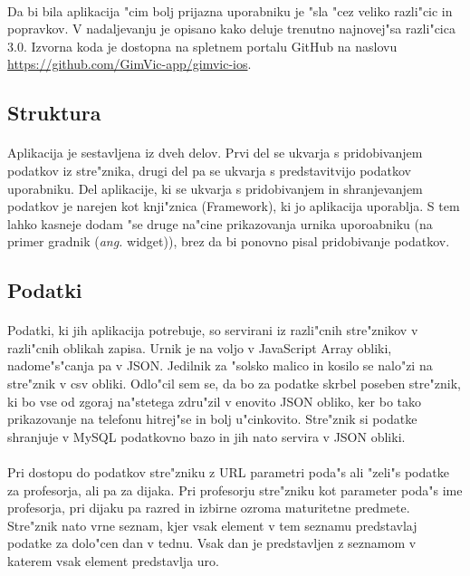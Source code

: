 \paragraph{}Da bi bila aplikacija "cim bolj prijazna uporabniku je "sla "cez veliko razli"cic in popravkov. V nadaljevanju je opisano kako deluje trenutno najnovej"sa razli"cica 3.0. Izvorna koda je dostopna na spletnem portalu GitHub na naslovu \url{https://github.com/GimVic-app/gimvic-ios}.

\subsection{Struktura}
\paragraph{}
Aplikacija je sestavljena iz dveh delov. Prvi del se ukvarja s pridobivanjem podatkov iz stre"znika, drugi del pa se ukvarja s predstavitvijo podatkov uporabniku. Del aplikacije, ki se ukvarja s pridobivanjem in shranjevanjem podatkov je narejen kot knji"znica (Framework), ki jo aplikacija uporablja. S tem lahko kasneje dodam "se druge na"cine prikazovanja urnika uporoabniku (na primer gradnik (\textit{ang.} widget)), brez da bi ponovno pisal pridobivanje podatkov.

\subsection{Podatki} 
\paragraph{}Podatki, ki jih aplikacija potrebuje, so servirani iz razli"cnih stre"znikov v razli"cnih oblikah zapisa. Urnik je na voljo v JavaScript Array\cite{js-array} obliki, nadome"s"canja pa v JSON\cite{json-wiki}. Jedilnik za "solsko malico in kosilo se nalo"zi na stre"znik v csv\cite{csv-wiki} obliki. Odlo"cil sem se, da bo za podatke skrbel poseben stre"znik, ki bo vse od zgoraj na"stetega zdru"zil v enovito JSON obliko, ker bo tako prikazovanje na telefonu hitrej"se in bolj u"cinkovito. Stre"znik si podatke shranjuje v MySQL\cite{mysql-wiki} podatkovno bazo\cite{rin} in jih nato servira v JSON obliki.

\paragraph{}Pri dostopu do podatkov stre"zniku z URL parametri\cite{query-string-wiki} poda"s ali "zeli"s podatke za profesorja, ali pa za dijaka. Pri profesorju stre"zniku kot parameter poda"s ime profesorja, pri dijaku pa razred in izbirne ozroma maturitetne predmete. Stre"znik nato vrne seznam, kjer vsak element v tem seznamu predstavlaj podatke za dolo"cen dan v tednu. Vsak dan je predstavljen z seznamom v katerem vsak element predstavlja uro.

